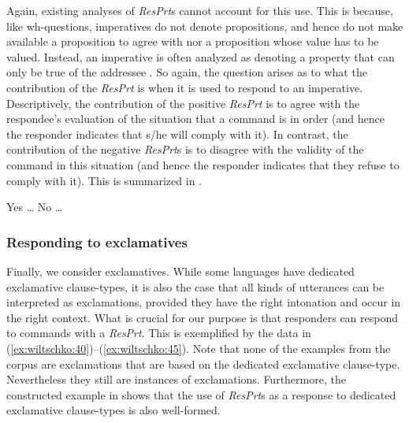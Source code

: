 \documentclass[output=paper]{LSP/langsci}
\begin{document}
Again, existing analyses of \textit{ResPrt}s cannot account for this use.
This is because, like wh-questions, imperatives do not denote propositions, and hence do not make available a proposition to agree with nor a proposition whose  value has to be valued.
Instead, an imperative is often analyzed as denoting a property that can only be true of the addressee \citep{Portner2004}. So again, the {question} arises as to what the contribution of the \textit{ResPrt} is when it is used to respond to an imperative.
Descriptively, the contribution of the positive \textit{ResPrt} is to agree with the respondee’s evaluation of the situation that a command is in order (and hence the responder indicates that s/he will comply with it). In contrast, the contribution of the negative \textit{ResPrt}s is to disagree with the validity of the command in this situation (and hence the responder indicates that they refuse to comply with it). This is summarized in . 


\ea\label{ex:wiltschko:39}
\settowidth{}
\begin{xlist}
\relax  [Imperative!]   
\begin{xlisti}
    \ex Yes …    
    \ex  No …    
   \end{xlisti}
    \end{xlist}
\z

\subsubsection{{Responding to exclamatives}}

Finally, we consider exclamatives. While some languages have dedicated exclamative clause-types, it is also the case that all kinds of utterances can be interpreted as exclamations, provided they have the right intonation and occur in the right context. What is crucial for our purpose is that responders can respond to commands with a \textit{ResPrt}. This is exemplified by the data in (\ref{ex:wiltschko:40})--(\ref{ex:wiltschko:45}). Note that none of the examples from the corpus are exclamations that are based on the dedicated exclamative clause-type.
Nevertheless they still are instances of exclamations. Furthermore, the constructed example in  shows that the use of \textit{ResPrt}s as a response to dedicated exclamative clause-types is also well-formed.
\end{document}
